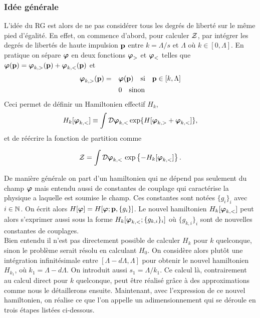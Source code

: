 \documentclass[10pt]{article}
\begin{document}
\begin{multicols}{2}
\subsubsection{Idée générale}

\label{sec:RG}

L'idée du RG est alors de ne pas considérer tous les degrés de liberté sur le même pied d'égalité. En effet, on commence d'abord, pour calculer $\mathcal{Z}$, par intégrer les degrés de libertés de haute impulsion ${\bf p}$ entre $k = \Lambda/s$ et $\Lambda$ où $k \in [0,\Lambda]$. En pratique on sépare $\boldsymbol{ \varphi}$ en deux fonctions $\boldsymbol{ \varphi}_>$ et $\boldsymbol{ \varphi}_<$ telles que $\boldsymbol{ \varphi}({\bf p}) = \boldsymbol{ \varphi}_{k,>}({\bf p}) + \boldsymbol{ \varphi}_{k,<}({\bf p})$ et
\begin{align}
	\boldsymbol{ \varphi}_{k,>}({\bf p})  = \quad & \boldsymbol{ \varphi}({\bf p}) \quad \text{si} \quad {\bf p} \in   [k,\Lambda] \\
	 & 0 \quad \text{sinon}
\end{align}
Ceci permet de définir un Hamiltonien effectif $H_k$, 
\begin{equation}
	H_k[\boldsymbol{ \varphi}_{k,<}] \equiv \int \mathcal{D} \boldsymbol{ \varphi}_{k,<}  \exp \{ H[\boldsymbol{ \varphi}_{k,>}+ \boldsymbol{ \varphi}_{k,<}] \},
\end{equation}
et de réécrire la fonction de partition comme 

\begin{equation}
\mathcal{Z} = \int \mathcal{D} \boldsymbol{ \varphi}_{k,<} \, \exp\left\{- H_k[\boldsymbol{ \varphi}_{k,<}]\right\}. 
\end{equation} 

De manière générale on part d'un hamiltonien qui ne dépend pas seulement du champ $\boldsymbol{ \varphi}$ mais entendu aussi de constantes de couplage qui caractérise la physique a laquelle est soumise le champ. Ces constantes sont notées $\{g_i\}_i$ avec $i \in \mathbb{N}$. On écrit alors $H[\boldsymbol{ \varphi}] = H[\boldsymbol{ \varphi} ; {\bf p}, \{g_i\}]$. Le nouvel hamiltonien $H_k[\boldsymbol{ \varphi}_{k,<}]$ peut alors s'exprimer aussi sous la forme $H_k[\boldsymbol{ \varphi}_{k,<} ; \{g_{k,i}\}_i]$ où $\{g_{k,i}\}_i$ sont de nouvelles constantes de couplages. \\

Bien entendu il n'est pas directement possible de calculer $H_k$ pour $k$ quelconque, sinon le problème serait résolu en calculant $H_0$. On considère alors plutôt une intégration infinitésimale entre $[\Lambda - d\Lambda, \Lambda]$ pour obtenir le nouvel hamiltonien $H_{k_1}$, où $k_1 = \Lambda - d\Lambda$. On introduit aussi $s_1 = \Lambda/k_1$. Ce calcul là, contrairement au calcul direct pour $k$ quelconque, peut être réalisé grâce à des approximations comme nous le détaillerons ensuite. Maintenant, avec l'expression de ce nouvel hamiltonien, on réalise ce que l'on appelle un adimensionnement qui se déroule en trois étapes listées ci-dessous.


\end{multicols}
\end{document}
